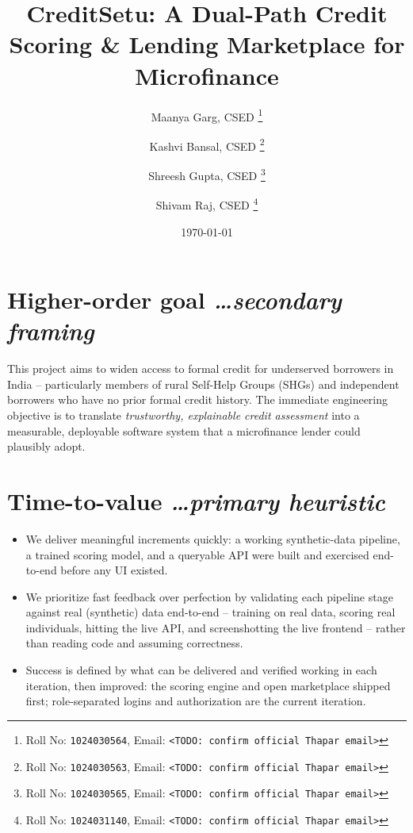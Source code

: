 \documentclass[11pt,a4paper]{article}
\title{CreditSetu: A Dual-Path Credit Scoring \& Lending Marketplace for Microfinance}
\author{
  Maanya Garg, CSED%
  \thanks{Roll No: \texttt{1024030564}, %
    Email: \texttt{<TODO: confirm official Thapar email>}}
  \and
  Kashvi Bansal, CSED%
  \thanks{Roll No: \texttt{1024030563}, %
    Email: \texttt{<TODO: confirm official Thapar email>}}
  \and
  Shreesh Gupta, CSED%
  \thanks{Roll No: \texttt{1024030565}, %
    Email: \texttt{<TODO: confirm official Thapar email>}}
  \and
  Shivam Raj, CSED%
  \thanks{Roll No: \texttt{1024031140}, %
    Email: \texttt{<TODO: confirm official Thapar email>}}
}
\date{\today}
\newcommand{\BvrHint}[1]{%
  {\normalfont\normalsize\itshape\hfill #1}}
\begin{document}
\maketitle

\section{Higher-order goal%
  \BvrHint{\ldots secondary framing}}
This project aims to widen access to formal credit for
underserved borrowers in India -- particularly members
of rural Self-Help Groups (SHGs) and independent
borrowers who have no prior formal credit history. The
immediate engineering objective is to translate
\emph{trustworthy, explainable credit assessment} into a
measurable, deployable software system that a
microfinance lender could plausibly adopt.

\section{Time-to-value %
\BvrHint{\ldots primary heuristic}}
\begin{itemize}[leftmargin=0.7cm]
    \item We deliver meaningful increments quickly: a
    working synthetic-data pipeline, a trained scoring
    model, and a queryable API were built and exercised
    end-to-end before any UI existed.
    \item We prioritize fast feedback over perfection by
    validating each pipeline stage against real
    (synthetic) data end-to-end -- training on real data,
    scoring real individuals, hitting the live API,
    and screenshotting the live frontend -- rather than
    reading code and assuming correctness.
    \item Success is defined by what can be delivered and
    verified working in each iteration, then improved:
    the scoring engine and open marketplace shipped first;
    role-separated logins and authorization are the
    current iteration.
\end{itemize}
\end{document}
